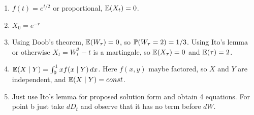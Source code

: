 \documentclass[pdftex,12pt,a4paper]{article}
\begin{document}
\begin{enumerate}
\item $f(t)=e^{t/2}$ or proportional, $\E(X_t)=0$.
\item $X_0=e^{-r}$
\item Using Doob's theorem, $\E(W_{\tau})=0$, so $\P(W_{\tau}=2)=1/3$. Using Ito's lemma or otherwise $X_t=W_t^2-t$ is a martingale, so $\E(X_{\tau})=0$ and $\E(\tau)=2$.
\item $\E(X \mid Y)= \int_0^1 x f(x \mid Y) \, dx$. Here $f(x,y)$ maybe factored, so $X$ and $Y$ are independent, and $\E(X \mid Y)=const$.
\item Just use Ito's lemma for proposed solution form and obtain 4 equations. For point b just take $dD_t$ and observe that it has no term before $dW$.
\end{enumerate}
\end{document}
